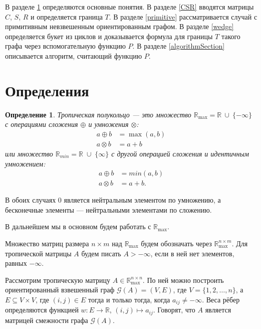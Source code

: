 \documentclass[12pt]{article}
\newtheorem{definition}[theorem]{Определение}
\begin{document}
В разделе \ref{definitions} определяются основные понятия. В разделе \ref{CSR} вводятся матрицы $C$, $S$, $R$ и определяется граница $T$. В разделе \ref{primitive} рассматривается случай с примитивным невзвешенным ориентированным графом. В разделе \ref{wedge} определяется букет из циклов и доказывается формула для границы $T$ такого графа через вспомогательную функцию $P$. В разделе \ref{algorithmSection} описывается алгоритм, считающий функцию $P$.

\section{Определения}
\label{definitions}
\begin{definition}
Тропическая полукольцо --- это множество $\mathbb{R}_{\max} = \mathbb{R} \ \cup \ \{ -\infty\}$ с операциями сложения $\oplus$ и умножения $\otimes$: \begin{align*}
            a \oplus b &= \max(a, b)\\
            a \otimes b &= a + b
        \end{align*}      
        или множество $\mathbb{R}_{min} = \mathbb{R} \; \cup \; \{ \infty\}$ с другой операцией сложения и идентичным умножением: \begin{align*}
            a \oplus b &= min(a, b)\\
            a \otimes b &= a + b.
        \end{align*}
\end{definition}

В обоих случаях $0$ является нейтральным элементом по умножению, а бесконечные элементы --- нейтральными элементами по сложению.

В дальнейшем мы в основном будем работать с $\mathbb{R}_{\max}$.

Множество матриц размера $n \times m$ над $\mathbb{R}_{\max}$ будем обозначать через $\mathbb{R}_{\max}^{n \times m}$. Для тропической матрицы $A$ будем писать $A > -\infty$, если в ней нет элементов, равных $-\infty$. 

Рассмотрим тропическую матрицу $A \in \mathbb{R}_{\max}^{n \times n}$. По ней можно построить ориентированный взвешенный граф $\mathcal{G}(A) = (V, E)$, где $V = \{ 1, 2, \dots, n\}$, а $E \subseteq V \times V$, где $(i, j) \in E$ тогда и только тогда, когда $a_{ij} \ne -\infty$. Веса рёбер определяются функцией $w : E \rightarrow \mathbb{R}$, $(i, j) \mapsto a_{ij}$. Говорят, что $A$ является матрицей смежности графа $\mathcal{G}(A)$.
\end{document}
